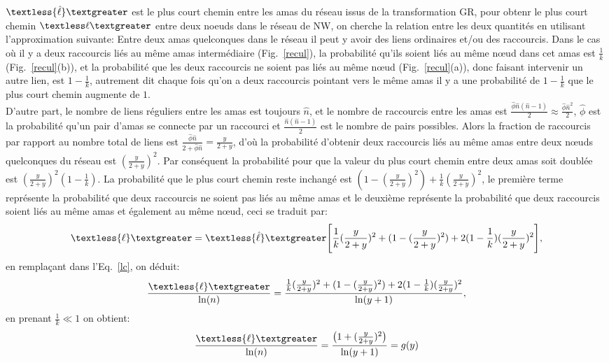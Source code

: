$\textless {\hat\ell} \textgreater$ est le plus court chemin entre les \textsf{amas} du réseau issus de la transformation GR, pour obtenr le plus court chemin $\textless \ell \textgreater$ entre deux noeuds dans le réseau de NW, on cherche la relation entre les deux quantités en utilisant l'approximation suivante:
Entre deux \textsf{\textsf{amas}} quelconques dans le réseau il peut y avoir des liens ordinaires et/ou des raccourcis. Dans le cas où il y a deux raccourcis liés au m\^{e}me \textsf{\textsf{amas}} intermédiaire (Fig.~\ref{recul}), la probabilité qu'ils soient liés au m\^{e}me nœud dans cet \textsf{\textsf{amas}} est $\frac{1}{k}$ (Fig.~\ref{recul}(b)), et la probabilité que les deux raccourcis ne soient pas liés au m\^{e}me nœud (Fig.~\ref{recul}(a)), donc faisant intervenir un autre lien, est  $1-\frac{1}{k}$, autrement dit chaque fois qu'on a deux raccourcis pointant vers le même \textsf{amas} il y a une probabilité de $1-\frac{1}{k}$ que le plus court chemin augmente de $1$.\\
D'autre part, le nombre de liens réguliers entre les \textsf{\textsf{amas}} est toujours
$\hat{n}$, et le nombre de raccourcis entre les \textsf{\textsf{amas}} est $\frac{\hat{\phi}\hat{n}(\hat{n}-1)}{2}\approx\frac{\hat{\phi}\hat{n}^2}{2}$,
$\hat{\phi}$ est la probabilité qu'un pair d'\textsf{\textsf{amas}} se connecte par un raccourci et $\frac{\hat{n}(\hat{n}-1)}{2}$ est le nombre de pairs possibles. Alors la fraction de raccourcis par rapport au nombre total de liens est $\frac{\hat{\phi}\hat{n}}{2+\hat{\phi}\hat{n}}=\frac{y}{2+y}$, d'où la probabilité d'obtenir deux raccourcis liés au m\^{e}me \textsf{\textsf{amas}} entre deux nœuds quelconques du réseau est $(\frac{y}{2+y})^2$. Par conséquent la probabilité pour que la valeur du plus court chemin entre deux \textsf{amas} soit doublée est $(\frac{y}{2+y})^2(1-\frac{1}{k})$. La probabilité que le plus court chemin reste inchangé est $(1-(\frac{y}{2+y})^2)+\frac{1}{k}(\frac{y}{2+y})^2$, le première terme représente la probabilité que deux raccourcis ne soient pas liés au m\^{e}me \textsf{\textsf{amas}} et le deuxième représente la probabilité 
que deux raccourcis soient liés au m\^{e}me \textsf{\textsf{amas}} et également au m\^{e}me nœud, ceci se traduit par: 
\begin{eqnarray}
\textless {\ell} \textgreater=\textless {\hat \ell} \textgreater \Bigg[\frac{1}{k}(\frac{y}{2+y})^2+(1-(\frac{y}{2+y})^2)+2(1-\frac{1}{k})(\frac{y}{2+y})^2\Bigg],
\end{eqnarray}
en remplaçant dans l'Eq.~\eqref{lc}, on déduit:
\begin{eqnarray}
\frac{\textless {\ell} \textgreater}{\ln(n)}=\frac{\frac{1}{k}(\frac{y}{2+y})^2+(1-(\frac{y}{2+y})^2)+2(1-\frac{1}{k})(\frac{y}{2+y})^2}{\ln(y+1)},
\end{eqnarray}
en prenant $\frac{1}{k}\ll1$ on obtient:
\begin{eqnarray}
\frac{\textless {\ell} \textgreater}{\ln(n)}=\frac{\big(1+(\frac{y}{2+y})^2\big)}{\ln(y+1)}=g(y)
\label{kp2}
\end{eqnarray}

